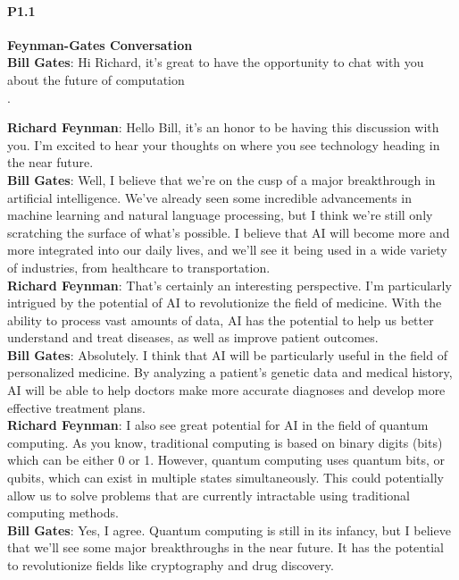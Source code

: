 \paragraph{P1.1} \textbf{Feynman-Gates Conversation}
\\

\textbf{Bill Gates}: Hi Richard, it's great to have the opportunity to chat with you about the future of computation\\.

\textbf{Richard Feynman}: Hello Bill, it's an honor to be having this discussion with you. I'm excited to hear your thoughts on where you see technology heading in the near future.\\

\textbf{Bill Gates}: Well, I believe that we're on the cusp of a major breakthrough in artificial intelligence. We've already seen some incredible advancements in machine learning and natural language processing, but I think we're still only scratching the surface of what's possible. I believe that AI will become more and more integrated into our daily lives, and we'll see it being used in a wide variety of industries, from healthcare to transportation.\\

\textbf{Richard Feynman}: That's certainly an interesting perspective. I'm particularly intrigued by the potential of AI to revolutionize the field of medicine. With the ability to process vast amounts of data, AI has the potential to help us better understand and treat diseases, as well as improve patient outcomes.\\

\textbf{Bill Gates}: Absolutely. I think that AI will be particularly useful in the field of personalized medicine. By analyzing a patient's genetic data and medical history, AI will be able to help doctors make more accurate diagnoses and develop more effective treatment plans.\\

\textbf{Richard Feynman}: I also see great potential for AI in the field of quantum computing. As you know, traditional computing is based on binary digits (bits) which can be either 0 or 1. However, quantum computing uses quantum bits, or qubits, which can exist in multiple states simultaneously. This could potentially allow us to solve problems that are currently intractable using traditional computing methods.\\

\textbf{Bill Gates}: Yes, I agree. Quantum computing is still in its infancy, but I believe that we'll see some major breakthroughs in the near future. It has the potential to revolutionize fields like cryptography and drug discovery.\\

